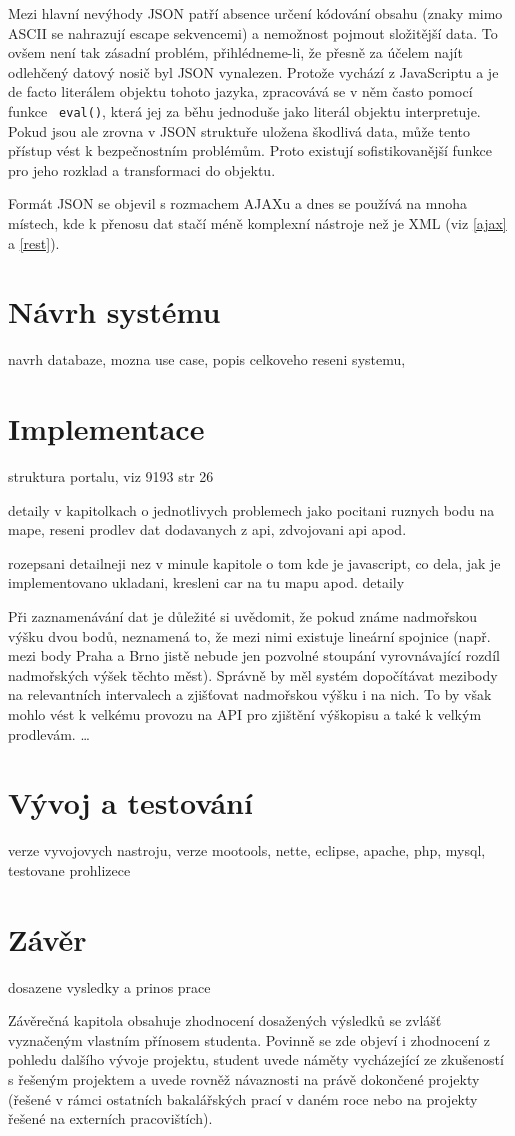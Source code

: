 Mezi hlavní nevýhody JSON patří absence určení kódování obsahu
(znaky mimo ASCII se nahrazují escape sekvencemi) a nemožnost pojmout
složitější data. To ovšem není tak zásadní problém,
přihlédneme-li, že přesně za účelem najít odlehčený datový nosič byl
JSON vynalezen. Protože vychází z JavaScriptu a je de facto literálem
objektu tohoto jazyka, zpracovává se v něm často pomocí funkce {\tt
eval()}, která jej za běhu jednoduše jako literál objektu
interpretuje. Pokud jsou ale zrovna v JSON struktuře uložena škodlivá
data, může tento přístup vést k bezpečnostním problémům. Proto
existují sofistikovanější funkce pro jeho rozklad a transformaci do
objektu. \cite{json}

Formát JSON se objevil s rozmachem AJAXu a dnes se používá na mnoha
místech, kde k přenosu dat stačí méně komplexní nástroje než je XML
(viz \ref{ajax} a \ref{rest}).

\chapter{Návrh systému}
navrh databaze, mozna use case, popis celkoveho reseni systemu,

\chapter{Implementace}
struktura portalu, viz 9193 str 26

detaily v kapitolkach o jednotlivych problemech jako pocitani ruznych
bodu na mape, reseni prodlev dat dodavanych z api, zdvojovani api apod.

rozepsani detailneji nez v minule kapitole o tom kde je javascript,
co dela, jak je implementovano ukladani, kresleni car na tu mapu
apod. detaily

Při zaznamenávání dat je důležité si uvědomit, že pokud známe
nadmořskou výšku dvou bodů, neznamená to, že mezi nimi existuje
lineární spojnice (např. mezi body Praha a Brno jistě nebude jen
pozvolné stoupání vyrovnávající rozdíl nadmořských výšek těchto
měst). Správně by měl systém dopočítávat mezibody na relevantních
intervalech a zjišťovat nadmořskou výšku i na nich. To by však mohlo
vést k velkému provozu na API pro zjištění výškopisu a také k velkým
prodlevám. \ldots

\chapter{Vývoj a testování}
verze vyvojovych nastroju, verze mootools, nette, eclipse, apache,
php, mysql, testovane prohlizece

\chapter*{Závěr}
dosazene vysledky a prinos prace

Závěrečná kapitola obsahuje zhodnocení dosažených výsledků se zvlášť
vyznačeným vlastním přínosem studenta. Povinně se zde objeví i
zhodnocení z pohledu dalšího vývoje projektu, student uvede náměty
vycházející ze zkušeností s řešeným projektem a uvede rovněž
návaznosti na právě dokončené projekty (řešené v rámci ostatních
bakalářských prací v daném roce nebo na projekty řešené na externích
pracovištích).
